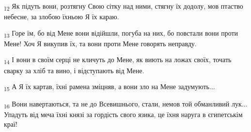 \begin{tcolorbox}
\textsubscript{12} Як підуть вони, розтягну Свою сітку над ними, стягну їх додолу, мов птаство небесне, за злобою їхньою Я їх караю.
\end{tcolorbox}
\begin{tcolorbox}
\textsubscript{13} Горе їм, бо від Мене вони відійшли, погуба на них, бо повстали вони проти Мене! Хоч Я викупив їх, та вони проти Мене говорять неправду.
\end{tcolorbox}
\begin{tcolorbox}
\textsubscript{14} І вони в своїм серці не кличуть до Мене, як виють на ложах своїх, точать сварку за хліб та вино, і відступають від Мене.
\end{tcolorbox}
\begin{tcolorbox}
\textsubscript{15} А Я їх картав, їхні рамена зміцняв, а вони зло на Мене задумують...
\end{tcolorbox}
\begin{tcolorbox}
\textsubscript{16} Вони навертаються, та не до Всевишнього, стали, немов той обманливий лук... Упадуть від меча їхні князі за гордість свого язика, це їхня наруга в єгипетськім краї!
\end{tcolorbox}
